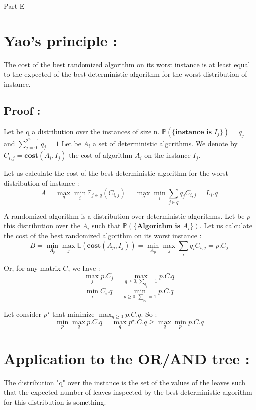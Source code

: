 \documentclass[12pt,a4paper]{article}
\begin{document}
\pagestyle{empty}

\begin{center} \LARGE \sc Part E \end{center}

\section*{Yao's principle :}

The cost of the best randomized algorithm on its worst instance is at least equal to the expected of the best deterministic algorithm for the worst distribution of instance.

\subsection*{Proof :}

Let be q a distribution over the instances of size n. $\mathbb{P}(\{\textbf{instance is }I_{j}\})=q_{j}$ and $\displaystyle{\sum_{j=0}^{2^n-1} q_{j} = 1}$
Let be $A_{i}$ a set of deterministic algorithms. We denote by $C_{i,j}= \textbf{cost}(A_{i},I_{j})$ the cost of algorithm $A_{i}$ on the instance $I_{j}$.

Let us calculate the cost of the best deterministic algorithm for the worst distribution of instance :
$$\displaystyle{A = \max_{q} \min_{i} \mathbb{E}_{j\in q} (C_{i,j}) = \max_{q} \min_{i} \sum_{j \in q} q_{j}C_{i,j} = L_{i}.q}$$
 
A randomized algorithm is a distribution over deterministic algorithms. Let be $p$ this distribution over the $A_{i}$ such that $\mathbb{P}(\{\textbf{Algorithm is } A_{i}\})$.
Let us calculate the cost of the best randomized algorithm on its worst instance :
$$\displaystyle{B = \min_{A_{p}} \max_{j} \mathbb{E}(\textbf{cost}(A_{p},I_{j})) = \min_{A_{p}} \max_{j} \sum_{i} q_{i}C_{i,j} = p.C_{j}}$$

Or, for any matrix $C$, we have :
$$\displaystyle{\max_{j}p.C_{j} = \max_{q\geq 0, \sum_{q_{j}}=1} p.C.q}$$
$$\displaystyle{\min_{i}C_{i}.q = \min_{p\geq 0, \sum_{p_{i}}=1} p.C.q}$$

Let consider $p^{\star}$ that minimize $\displaystyle{\max_{q\geq 0} p.C.q}$. So :
$$\displaystyle{\min_{p} \max_{q} p.C.q = \max_{q}p^{\star}.C.q \geq \max_{q} \min_{p} p.C.q} $$
\flushright{$\square$}
\flushleft

\section*{Application to the OR/AND tree :} 
The distribution "q" over the instance is the set of the values of the leaves such that the expected number of leaves inspected by the best deterministic algorithm for this distribution is something.
\end{document}
